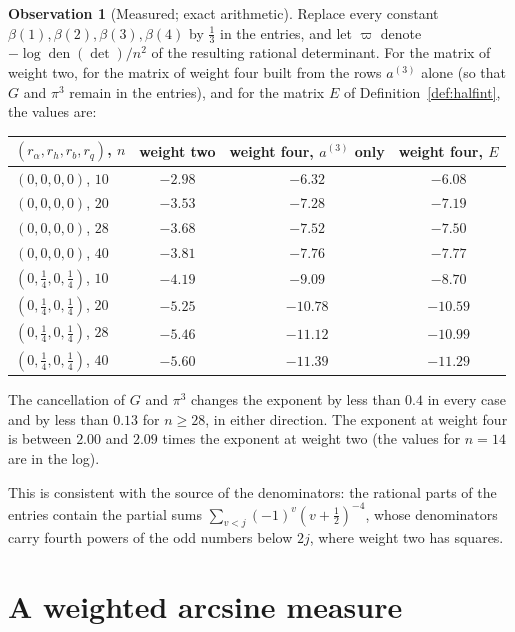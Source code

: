 \documentclass[11pt]{article}
\theoremstyle{definition}
\newtheorem{observation}[theorem]{Observation}
\begin{document}
\begin{observation}[Measured; exact arithmetic]\label{obs:denoms}
Replace every constant $\beta(1),\beta(2),\beta(3),\beta(4)$ by $\frac13$ in the entries, and let $\varpi$ denote $-\log\operatorname{den}(\det)/n^2$ of the resulting rational determinant. For the matrix of weight two, for the matrix of weight four built from the rows $a^{(3)}$ alone (so that $G$ and $\pi^3$ remain in the entries), and for the matrix $E$ of Definition~\ref{def:halfint}, the values are:
\begin{center}
\small
\begin{tabular}{lccc}
\toprule
$(r_\alpha,r_h,r_b,r_q)$, $n$ & weight two & weight four, $a^{(3)}$ only & weight four, $E$\\
\midrule
$(0,0,0,0)$, $10$ & $-2.98$ & $-6.32$ & $-6.08$\\
$(0,0,0,0)$, $20$ & $-3.53$ & $-7.28$ & $-7.19$\\
$(0,0,0,0)$, $28$ & $-3.68$ & $-7.52$ & $-7.50$\\
$(0,0,0,0)$, $40$ & $-3.81$ & $-7.76$ & $-7.77$\\
$(0,\frac14,0,\frac14)$, $10$ & $-4.19$ & $-9.09$ & $-8.70$\\
$(0,\frac14,0,\frac14)$, $20$ & $-5.25$ & $-10.78$ & $-10.59$\\
$(0,\frac14,0,\frac14)$, $28$ & $-5.46$ & $-11.12$ & $-10.99$\\
$(0,\frac14,0,\frac14)$, $40$ & $-5.60$ & $-11.39$ & $-11.29$\\
\bottomrule
\end{tabular}
\end{center}
The cancellation of $G$ and $\pi^3$ changes the exponent by less than $0.4$ in every case and by less than $0.13$ for $n\ge28$, in either direction. The exponent at weight four is between $2.00$ and $2.09$ times the exponent at weight two (the values for $n=14$ are in the log).
\end{observation}

This is consistent with the source of the denominators: the rational parts of the entries contain the partial sums $\sum_{v<j}(-1)^v(v+\frac12)^{-4}$, whose denominators carry fourth powers of the odd numbers below $2j$, where weight two has squares.

\section{A weighted arcsine measure}\label{sec:weighted}
\end{document}
